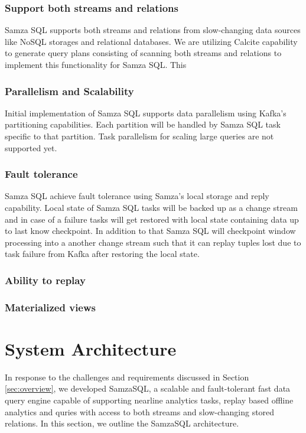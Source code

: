 \documentclass[10pt, conference, compsocconf]{IEEEtran}
\begin{document}
\subsubsection{Support both streams and relations}

Samza SQL supports both streams and relations from slow-changing data sources like NoSQL storages and relational databases. We are utilizing Calcite capability to generate query plans consisting of scanning both streams and relations to implement this functionality for Samza SQL. This 

\subsubsection{Parallelism and Scalability}

Initial implementation of Samza SQL supports data parallelism using Kafka's partitioning capabilities. Each partition will be handled by Samza SQL task specific to that partition. Task parallelism for scaling large queries are not supported yet.

\subsubsection{Fault tolerance}

Samza SQL achieve fault tolerance using Samza's local storage and reply capability. Local state of Samza SQL tasks will be backed up as a change stream and in case of a failure tasks will get restored with local state containing data up to last know checkpoint. In addition to that Samza SQL will checkpoint window processing into a another change stream such that it can replay tuples lost due to task failure from Kafka after restoring the local state.

\subsubsection{Ability to replay}


\subsubsection{Materialized views}

\section{System Architecture}

In response to the challenges and requirements discussed in Section \ref{sec:overview}, we developed SamzaSQL, a scalable and fault-tolerant fast data query engine capable of supporting nearline analytics tasks, replay based offline analytics and quries with access to both streams and slow-changing stored relations. In this section, we outline the SamzaSQL architecture.
\end{document}
